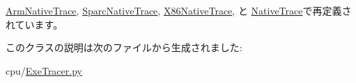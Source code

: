 \hyperlink{classArmNativeTrace_1_1ArmNativeTrace_acce15679d830831b0bbe8ebc2a60b2ca}{ArmNativeTrace}, \hyperlink{classSparcNativeTrace_1_1SparcNativeTrace_acce15679d830831b0bbe8ebc2a60b2ca}{SparcNativeTrace}, \hyperlink{classX86NativeTrace_1_1X86NativeTrace_acce15679d830831b0bbe8ebc2a60b2ca}{X86NativeTrace}, と \hyperlink{classNativeTrace_1_1NativeTrace_acce15679d830831b0bbe8ebc2a60b2ca}{NativeTrace}で再定義されています。

このクラスの説明は次のファイルから生成されました:\begin{DoxyCompactItemize}
\item 
cpu/\hyperlink{ExeTracer_8py}{ExeTracer.py}\end{DoxyCompactItemize}
